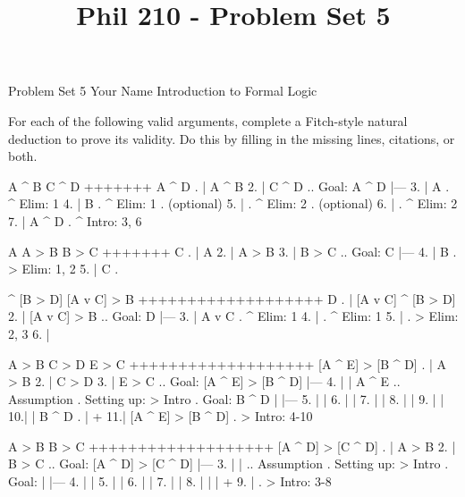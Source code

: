 
\title{Phil 210 - Problem Set 5}

\heading
Problem Set 5
Your Name
Introduction to Formal Logic
\endheading

For each of the following valid arguments, complete a Fitch-style natural deduction to prove its validity. Do this by filling in the missing lines, citations, or both.

\problems
{}
\argument
 A ^ B
 C ^ D
+++++++
 A ^ D
\endargument
        \answer
        . | A ^ B
         2. | C ^ D  ..  Goal: A ^ D
            |---
         3. | A      .  ^ Elim: 1
         4. | B      .  ^ Elim: 1  .  (optional)
         5. |        .  ^ Elim: 2  .  (optional)
         6. |        .  ^ Elim: 2
         7. | A ^ D  .  ^ Intro: 3, 6
        \endfitchproof
        \endanswer

\argument
 A
 A > B
 B > C
+++++++
 C
\endargument
        \answer
        . | A
         2. | A > B
         3. | B > C  ..  Goal: C
            |---
         4. | B      .  > Elim: 1, 2
         5. | C      .  
        \endfitchproof
        \endanswer

\argument
 [A v C] ^ [B > D]
 [A v C] > B
+++++++++++++++++++
 D
\endargument
        \answer
        . | [A v C] ^ [B > D]
         2. | [A v C] > B        ..  Goal: D
            |---
         3. | A v C              .  ^ Elim: 1
         4. |                    .  ^ Elim: 1
         5. |                    .  > Elim: 2, 3
         6. | 
        \endfitchproof
        \endanswer

\argument
 A > B
 C > D
 E > C
+++++++++++++++++++
 [A ^ E] > [B ^ D]
\endargument
        \answer
        . | A > B
         2. | C > D
         3. | E > C      ..  Goal: [A ^ E] > [B ^ D]
            |---
         4. |   | A ^ E  ..  Assumption  .  Setting up: > Intro  .  Goal: B ^ D
            |   |---
         5. |   | 
         6. |   | 
         7. |   | 
         8. |   | 
         9. |   | 
         10.|   | B ^ D   .  
            |   +
         11.| [A ^ E] > [B ^ D]  .  > Intro: 4-10
        \endfitchproof
        \endanswer

\argument
 A > B
 B > C
+++++++++++++++++++
 [A ^ D] > [C ^ D]
\endargument
        \answer
        . | A > B
         2. | B > C      ..  Goal: [A ^ D] > [C ^ D]
            |---
         3. |   |        ..  Assumption  .  Setting up: > Intro  .  Goal: 
            |   |---
         4. |   | 
         5. |   | 
         6. |   | 
         7. |   | 
         8. |   | 
            |   +
         9. |            .  > Intro: 3-8
        \endfitchproof
        \endanswer

